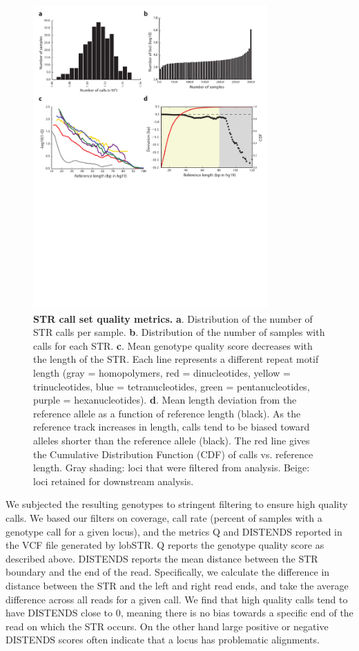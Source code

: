 \begin{figure}[h!]
\centering
\label{fig:sgdpfig1}
\includegraphics[width=0.8\textwidth]{Figures/App3/Fig1.pdf}
\caption{\textbf{STR call set quality metrics.} \textbf{a}. Distribution of the number of STR calls per sample. \textbf{b}. Distribution of the number of samples with calls for each STR. \textbf{c}. Mean genotype quality score decreases with the length of the STR. Each line represents a different repeat motif length (gray = homopolymers, red = dinucleotides, yellow = trinucleotides, blue = tetranucleotides, green = pentanucleotides, purple = hexanucleotides). \textbf{d}. Mean length deviation from the reference allele as a function of reference length (black). As the reference track increases in length, calls tend to be biased toward alleles shorter than the reference allele (black). The red line gives the Cumulative Distribution Function (CDF) of calls vs. reference length. Gray shading: loci that were filtered from analysis. Beige: loci retained for downstream analysis.}
\end{figure}

We subjected the resulting genotypes to stringent filtering to ensure high quality calls. We based our filters on coverage, call rate (percent of samples with a genotype call for a given locus), and the metrics Q and DISTENDS reported in the VCF file generated by lobSTR. Q reports the genotype quality score as described above. DISTENDS reports the mean distance between the STR boundary and the end of the read. Specifically, we calculate the difference in distance between the STR and the left and right read ends, and take the average difference across all reads for a given call. We find that high quality calls tend to have DISTENDS close to 0, meaning there is no bias towards a specific end of the read on which the STR occurs. On the other hand large positive or negative DISTENDS scores often indicate that a locus has problematic alignments.


